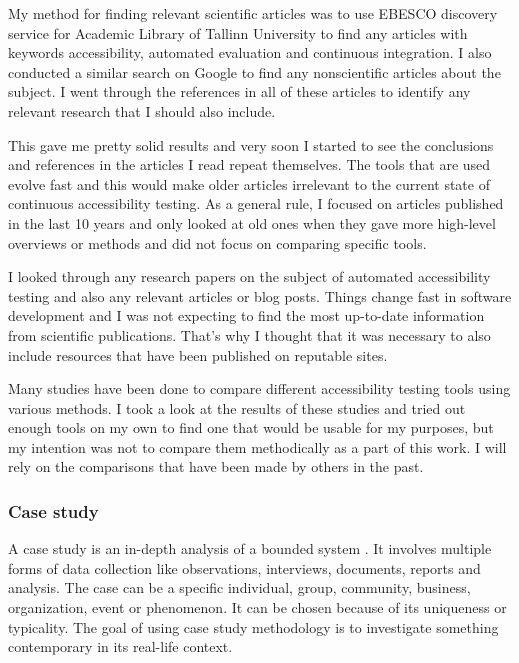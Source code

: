 \documentclass{master_thesis}
\begin{document}
My method for finding relevant scientific articles was to use EBESCO discovery service for Academic Library of Tallinn University to find any articles with keywords accessibility, automated evaluation and continuous integration. I also conducted a similar search on Google to find any nonscientific articles about the subject. I went through the references in all of these articles to identify any relevant research that I should also include.

This gave me pretty solid results and very soon I started to see the conclusions and references in the articles I read repeat themselves. The tools that are used evolve fast and this would make older articles irrelevant to the current state of continuous accessibility testing. As a general rule, I focused on articles published in the last 10 years and only looked at old ones when they gave more high-level overviews or methods and did not focus on comparing specific tools.

I looked through any research papers on the subject of automated accessibility testing and also any relevant articles or blog posts. Things change fast in software development and I was not expecting to find the most up-to-date information from scientific publications. That's why I thought that it was necessary to also include resources that have been published on reputable sites.

Many studies \citep{Alsaeedi2020, Ismailova2022, Sane2021, Vigo2013, RybinKoob2022, Duran2017} have been done to compare different accessibility testing tools using various methods. I took a look at the results of these studies and tried out enough tools on my own to find one that would be usable for my purposes, but my intention was not to compare them methodically as a part of this work. I will rely on the comparisons that have been made by others in the past.

\subsubsection{Case study}

A case study is an in-depth analysis of a bounded system \citep{Range2023}. It involves multiple forms of data collection like observations, interviews, documents, reports and analysis. The case can be a specific individual, group, community, business, organization, event or phenomenon. It can be chosen because of its uniqueness or typicality. The goal of using case study methodology is to investigate something contemporary in its real-life context.
\end{document}
